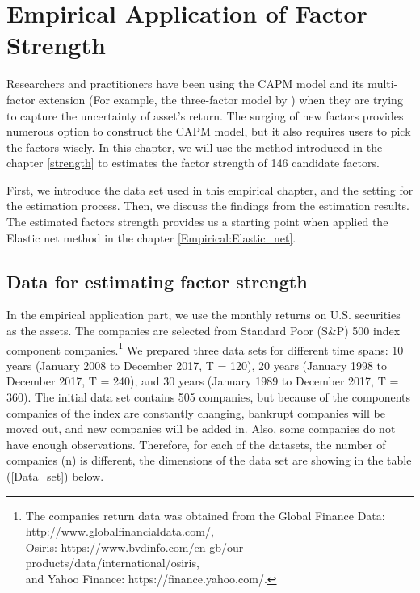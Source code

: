 \chapter{Empirical Application of Factor Strength}\label{Empirical:factor_strength}
	
Researchers and practitioners have been using the CAPM model \cite{Sharpe1964, Lintner1965, Black1972} and its multi-factor extension (For example, the three-factor model by ) when they are trying to capture the uncertainty of asset's return.
The surging of new factors \cite{Harvey2019} provides numerous option to construct the CAPM model, but it also requires users to pick the factors wisely.
In this chapter, we will use the method introduced in the chapter \ref{strength} to estimates the factor strength of 146 candidate factors.

First, we introduce the data set used in this empirical chapter, and the setting for the estimation process.
Then, we discuss the findings from the estimation results.
The estimated factors strength provides us a starting point when applied the Elastic net method in the chapter \ref{Empirical:Elastic_net}.
	\section{Data for estimating factor strength}\label{data}
	
In the empirical application part, we use the monthly returns on U.S. securities as the assets.
The companies are selected from Standard Poor (S\&P) 500 index component companies.\footnote{The companies return data was obtained from the Global Finance Data: http://www.globalfinancialdata.com/,\\ Osiris: https://www.bvdinfo.com/en-gb/our-products/data/international/osiris, \\and Yahoo Finance: https://finance.yahoo.com/.}
We prepared three data sets for different time spans: 10 years (January 2008 to December 2017, T = 120), 20 years (January 1998 to December 2017, T  = 240), and 30 years (January 1989 to December 2017, T = 360).
The initial data set contains 505 companies, but because of the components companies of the index are constantly changing, bankrupt companies will be moved out, and new companies will be added in.
Also, some companies do not have enough observations.
Therefore, for each of the datasets, the number of companies (n) is different, the dimensions of the data set are showing in the table (\ref{Data_set}) below.

